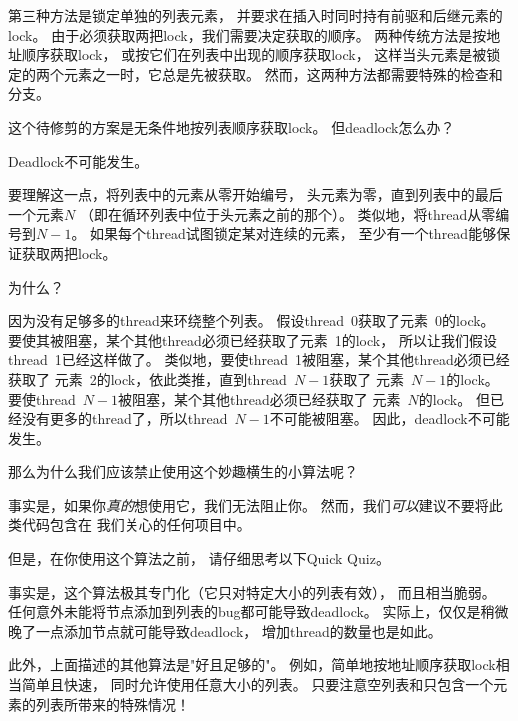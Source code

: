 第三种方法是锁定单独的列表元素，
并要求在插入时同时持有前驱和后继元素的lock。
由于必须获取两把lock，我们需要决定获取的顺序。
两种传统方法是按地址顺序获取lock，
或按它们在列表中出现的顺序获取lock，
这样当头元素是被锁定的两个元素之一时，它总是先被获取。
然而，这两种方法都需要特殊的检查和分支。

这个待修剪的方案是无条件地按列表顺序获取lock。
但deadlock怎么办？

Deadlock不可能发生。

要理解这一点，将列表中的元素从零开始编号，
头元素为零，直到列表中的最后一个元素$N$
（即在循环列表中位于头元素之前的那个）。
类似地，将thread从零编号到$N-1$。
如果每个thread试图锁定某对连续的元素，
至少有一个thread能够保证获取两把lock。

为什么？

因为没有足够多的thread来环绕整个列表。
假设thread~0获取了元素~0的lock。
要使其被阻塞，某个其他thread必须已经获取了元素~1的lock，
所以让我们假设thread~1已经这样做了。
类似地，要使thread~1被阻塞，某个其他thread必须已经获取了
元素~2的lock，依此类推，直到thread~$N-1$获取了
元素~$N-1$的lock。
要使thread~$N-1$被阻塞，某个其他thread必须已经获取了
元素~$N$的lock。
但已经没有更多的thread了，所以thread~$N-1$不可能被阻塞。
因此，deadlock不可能发生。

那么为什么我们应该禁止使用这个妙趣横生的小算法呢？

事实是，如果你\emph{真的}想使用它，我们无法阻止你。
然而，我们\emph{可以}建议不要将此类代码包含在
我们关心的任何项目中。

但是，在你使用这个算法之前，
请仔细思考以下Quick Quiz。

\QuickQuizEnd

事实是，这个算法极其专门化（它只对特定大小的列表有效），
而且相当脆弱。
任何意外未能将节点添加到列表的bug都可能导致deadlock。
实际上，仅仅是稍微晚了一点添加节点就可能导致deadlock，
增加thread的数量也是如此。

此外，上面描述的其他算法是"好且足够的"。
例如，简单地按地址顺序获取lock相当简单且快速，
同时允许使用任意大小的列表。
只要注意空列表和只包含一个元素的列表所带来的特殊情况！

\QuickQuizEnd

